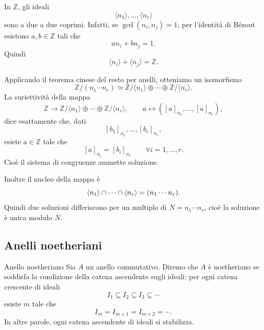 \documentclass[a4paper]{article}
\begin{document}
\begin{radioactive}
\begin{snippetproof}{}
    In \(\mathbb{Z}\), gli ideali
    \[
        \langle n_1 \rangle,\ldots,\langle n_r \rangle
    \]
    sono a due a due coprimi. Infatti, se \(\gcd(n_i,n_j)=1\), per l'identità di Bézout esistono \(a,b\in\mathbb{Z}\) tali che
    \[
        an_i+bn_j=1.
    \]
    Quindi
    \[
        \langle n_i \rangle+\langle n_j \rangle=\mathbb{Z}.
    \]

    Applicando il teorema cinese del resto per anelli, otteniamo un isomorfismo
    \[
        \mathbb{Z}/(n_1\cdots n_r)
        \simeq
        \mathbb{Z}/\langle n_1 \rangle\oplus\cdots\oplus\mathbb{Z}/\langle n_r \rangle.
    \]
    La suriettività della mappa
    \[
        \mathbb{Z}\to
        \mathbb{Z}/\langle n_1 \rangle\oplus\cdots\oplus\mathbb{Z}/\langle n_r \rangle,
        \qquad
        a\mapsto
        ([a]_{n_1},\ldots,[a]_{n_r}),
    \]
    dice esattamente che, dati
    \[
        [b_1]_{n_1},\ldots,[b_r]_{n_r},
    \]
    esiste \(a\in\mathbb{Z}\) tale che
    \[
        [a]_{n_i}=[b_i]_{n_i}
        \qquad
        \forall i=1,\ldots,r.
    \]
    Cioè il sistema di congruenze ammette soluzione.

    Inoltre il nucleo della mappa è
    \[
        \langle n_1 \rangle\cap\cdots\cap\langle n_r \rangle
        =
        (n_1\cdots n_r).
    \]
    Quindi due soluzioni differiscono per un multiplo di \(N=n_1\cdots n_r\), cioè la soluzione è unica modulo \(N\).
\end{snippetproof}
\end{radioactive}

\subsection{Anelli noetheriani}

\begin{radioactive}
\begin{snippetdefinition}{Anello noetheriano}
    Sia \(A\) un anello commutativo. Diremo che \(A\) è noetheriano se soddisfa la condizione della catena ascendente sugli ideali: per ogni catena crescente di ideali
    \[
        I_1\subseteq I_2\subseteq I_3\subseteq\cdots
    \]
    esiste \(m\) tale che
    \[
        I_m=I_{m+1}=I_{m+2}=\cdots.
    \]
    In altre parole, ogni catena ascendente di ideali si stabilizza.
\end{snippetdefinition}
\end{radioactive}
\end{document}
